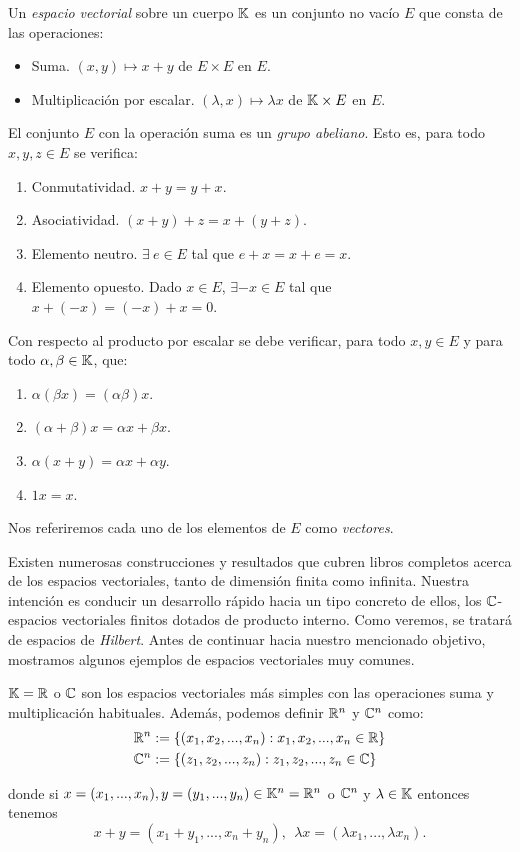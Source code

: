 \begin{definition} Un \textit{espacio vectorial} sobre un cuerpo $\mathbb{K}$ es un conjunto no vacío $E$ que consta de las operaciones:
\begin{itemize}
\item Suma. $(x,y)\mapsto x+y$ de $E\times E$ en $E$.
\item Multiplicación por escalar. $(\lambda,x)\mapsto \lambda x$ de $\mathbb{K}\times E$ en $E$.
\end{itemize}
El conjunto $E$ con la operación suma es un \textit{grupo abeliano}. Esto es, para todo $x,y,z\in E$ se verifica:
\begin{enumerate}[label=\alph*)]
\item Conmutatividad. $x + y = y + x$.
\item Asociatividad. $(x + y) + z = x + (y + z)$.
\item Elemento neutro. $\exists\ e\in E$ tal que $e+x=x+e=x$.
\item Elemento opuesto. Dado $x\in E$, $\exists -x\in E$ tal que $x+(-x)=(-x)+x=0$.
\end{enumerate}
Con respecto al producto por escalar se debe verificar, para todo $x,y\in E$ y para todo $\alpha,\beta\in\mathbb{K}$, que:
\begin{enumerate}[label=\alph*)]
\item $\alpha(\beta x)=(\alpha\beta)x$.
\item $(\alpha + \beta)x=\alpha x +\beta x$.
\item $\alpha (x + y) =\alpha x +\alpha y$.
\item $1x = x$.
\end{enumerate}
Nos referiremos cada uno de los elementos de $E$ como \textit{vectores}.
\end{definition}

Existen numerosas construcciones y resultados que cubren libros completos acerca de los espacios vectoriales, tanto de dimensión finita como infinita. Nuestra intención es conducir un desarrollo rápido hacia un tipo concreto de ellos, los $\mathbb{C}$-espacios vectoriales finitos dotados de producto interno. Como veremos, se tratará de espacios de \textit{Hilbert}. Antes de continuar hacia nuestro mencionado objetivo, mostramos algunos ejemplos de espacios vectoriales muy comunes.

\begin{example} $\mathbb{K}=\mathbb{R}$ o $\mathbb{C}$ son los espacios vectoriales más simples con las operaciones suma y multiplicación habituales. Además, podemos definir $\mathbb{R}^n$ y $\mathbb{C}^n$ como:
%
\[
\begin{split}
&\mathbb{R}^n:=\{(x_1,x_2,...,x_n): x_1,x_2,...,x_n\in\mathbb{R}\} \\
&\mathbb{C}^n:=\{(z_1,z_2,...,z_n): z_1,z_2,...,z_n\in\mathbb{C}\}
\end{split}
\]%

\noindent donde si $x=(x_1,...,x_n),y=(y_1,...,y_n)\in\mathbb{K}^n=\mathbb{R}^n$ o $\mathbb{C}^n$ y $\lambda\in\mathbb{K}$ entonces tenemos
\[x+y=(x_1+y_1,...,x_n+y_n),\ \ \lambda x=(\lambda x_1,...,\lambda x_n).\]
\end{example}

